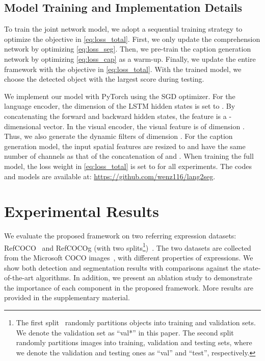 \documentclass{bmvc2k}
\begin{document}
\subsection{Model Training and Implementation Details}
To train the joint network model, we adopt a sequential training strategy to optimize the objective in \eqref{eq:loss_total}.
First, we only update the comprehension network by optimizing \eqref{eq:loss_seg}.
Then, we pre-train the caption generation network by optimizing \eqref{eq:loss_cap} as a warm-up.
Finally, we update the entire framework with the objective in \eqref{eq:loss_total}.
With the trained model, we choose the detected object with the largest score during testing.


We implement our model with PyTorch using the SGD optimizer.
For the language encoder, the dimension of the LSTM hidden states is set to . 
By concatenating the forward and backward hidden states, the feature  is a -dimensional vector.
In the visual encoder, the visual feature  is of dimension . 
Thus, we also generate the dynamic filters of dimension .
For the caption generation model, the input spatial features are resized to  and have the same number of channels as that of the concatenation of  and .
When training the full model, the loss weight  in \eqref{eq:loss_total} is set to  for all experiments. 
The codes and models are available at: \url{https://github.com/wenz116/lang2seg}.
\section{Experimental Results}
We evaluate the proposed framework on two referring expression datasets: RefCOCO~\cite{Yu_ECCV_2016} and RefCOCOg (with two splits\footnote{The first split~\cite{Mao_CVPR_2016} randomly partitions objects into training and validation sets. We denote the validation set as ``val*'' in this paper. The second split~\cite{Nagaraja_ECCV_2016} randomly partitions images into training, validation and testing sets, where we denote the validation and testing ones as ``val'' and ``test'', respectively.})~\cite{Mao_CVPR_2016,Nagaraja_ECCV_2016}.
The two datasets are collected from the Microsoft COCO images~\cite{MSCOCO}, with different properties of expressions.
We show both detection and segmentation results with comparisons against the state-of-the-art algorithms.
In addition, we present an ablation study to demonstrate the importance of each component in the proposed framework.
More results are provided in the supplementary material.
\end{document}
